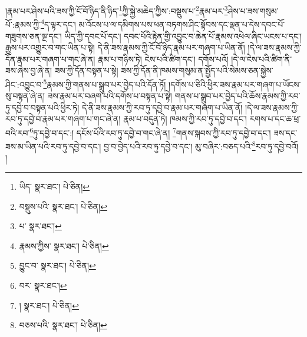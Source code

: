 །རྣམ་པར་ཤེས་པའི་ཟས་ཀྱི་ངོ་བོ་ཉིད་ནི་ཉིད་\footnote{ཡིད་  སྣར་ཐང་།  པེ་ཅིན། }ཀྱི་སྐྱེ་མཆེད་ཀྱིས་:བསྡུས་པ་\footnote{བསྡུས་པའི་  སྣར་ཐང་།  པེ་ཅིན། }རྣམ་པར་\footnote{པ་  སྣར་ཐང་། }ཤེས་པ་ཟས་གསུམ་པོ་:རྣམས་ཀྱི་\footnote{རྣམས་ཀྱིས་  སྣར་ཐང་།  པེ་ཅིན། }ད་ལྟར་དང་། མ་འོངས་པ་ལ་དམིགས་པས་ཕན་བཏགས་ཤིང་སྟོབས་དང་ལྡན་པ་དེས་དབང་པོ་གཟུགས་ཅན་ལྔ་དང་། ཡིད་ཀྱི་དབང་པོ་དང་། དབང་པོའི་རྟེན་གྱི་འབྱུང་བ་ཆེན་པོ་རྣམས་འཕེལ་ཞིང་ཡངས་པ་དང་། རྒྱས་པར་འགྱུར་བ་གང་ཡིན་པ་སྟེ། དེ་ནི་ཟས་རྣམས་ཀྱི་ངོ་བོ་ཉིད་རྣམ་པར་གཞག་པ་ཡིན་ནོ། །དེ་ལ་ཟས་རྣམས་ཀྱི་དོན་རྣམ་པར་གཞག་པ་གང་ཞེ་ན། རྣམ་པ་གཉིས་ཏེ། ངེས་པའི་ཚིག་དང་། དགོས་པའོ། །དེ་ལ་ངེས་པའི་ཚིག་ནི་ཟས་ཞེས་བྱ་ཞེ་ན། ཟས་ཀྱི་དོན་བསྟན་པ་སྟེ། ཟས་ཀྱི་དོན་ནི་ཁམས་གསུམ་ན་སྤྱོད་པའི་སེམས་ཅན་སྐྱེས་ཤིང་:འབྱུང་བ་\footnote{བྱུང་བ་  སྣར་ཐང་།  པེ་ཅིན། }རྣམས་ཀྱི་གནས་པ་སྒྲུབ་པར་བྱེད་པའི་དོན་ཏོ། །དགོས་པ་ཅིའི་ཕྱིར་ཟས་རྣམ་པར་གཞག་པ་ཡོངས་སུ་བསྟན་ཞེ་ན། ཟས་རྣམ་པར་བཞག་པའི་དགོས་པ་བསྟན་པ་སྟེ། གནས་པ་སྒྲུབ་པར་བྱེད་པའི་ཆོས་རྣམས་ཀྱི་རབ་ཏུ་དབྱེ་བ་བསྟན་པའི་ཕྱིར་ཏེ། དེ་ནི་ཟས་རྣམས་ཀྱི་རབ་ཏུ་དབྱེ་བ་རྣམ་པར་གཞག་པ་ཡིན་ནོ། །དེ་ལ་ཟས་རྣམས་ཀྱི་རབ་ཏུ་དབྱེ་བ་རྣམ་པར་གཞག་པ་གང་ཞེ་ན། རྣམ་པ་བདུན་ཏེ། ཁམས་ཀྱི་རབ་ཏུ་དབྱེ་བ་དང་། རགས་པ་དང་ཆ་ཕྲ་བའི་རབ་\footnote{བར་  སྣར་ཐང་། }ཏུ་དབྱེ་བ་དང་:། དངོས་པོའི་རབ་ཏུ་དབྱེ་བ་གང་ཞེ་ན། \footnote{།    སྣར་ཐང་།  པེ་ཅིན། }གནས་སྐབས་ཀྱི་རབ་ཏུ་དབྱེ་བ་དང་། ཟས་དང་ཟས་མ་ཡིན་པའི་རབ་ཏུ་དབྱེ་བ་དང་། བྱ་བ་བྱེད་པའི་རབ་ཏུ་དབྱེ་བ་དང་། མུ་བཞིར་:བཅད་པའི་\footnote{བཅས་པའི་  སྣར་ཐང་།  པེ་ཅིན། }རབ་ཏུ་དབྱེ་བའོ། །
